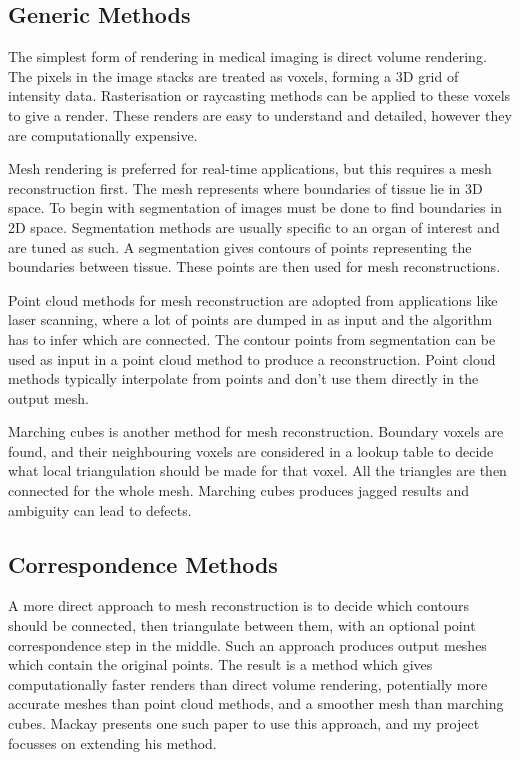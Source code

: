 \documentclass[10pt]{article}
\begin{document}
\subsection{Generic Methods}

The simplest form of rendering in medical imaging is direct volume rendering. The pixels in the image stacks are treated as voxels, forming a 3D grid of intensity data. Rasterisation or raycasting methods can be applied to these voxels to give a render. These renders are easy to understand and detailed, however they are computationally expensive.

Mesh rendering is preferred for real-time applications, but this requires a mesh reconstruction first. The mesh represents where boundaries of tissue lie in 3D space. To begin with segmentation of images must be done to find boundaries in 2D space. Segmentation methods are usually specific to an organ of interest and are tuned as such. A segmentation gives contours of points representing the boundaries between tissue. These points are then used for mesh reconstructions.

Point cloud methods for mesh reconstruction are adopted from applications like laser scanning, where a lot of points are dumped in as input and the algorithm has to infer which are connected. The contour points from segmentation can be used as input in a point cloud method to produce a reconstruction. Point cloud methods typically interpolate from points and don't use them directly in the output mesh.

Marching cubes is another method for mesh reconstruction. Boundary voxels are found, and their neighbouring voxels are considered in a lookup table to decide what local triangulation should be made for that voxel. All the triangles are then connected for the whole mesh. Marching cubes produces jagged results and ambiguity can lead to defects.

\subsection{Correspondence Methods}

A more direct approach to mesh reconstruction is to decide which contours should be connected, then triangulate between them, with an optional point correspondence step in the middle. Such an approach produces output meshes which contain the original points. The result is a method which gives computationally faster renders than direct volume rendering, potentially more accurate meshes than point cloud methods, and a smoother mesh than marching cubes. Mackay \cite{mackay2019robust} presents one such paper to use this approach, and my project focusses on extending his method.
\end{document}
